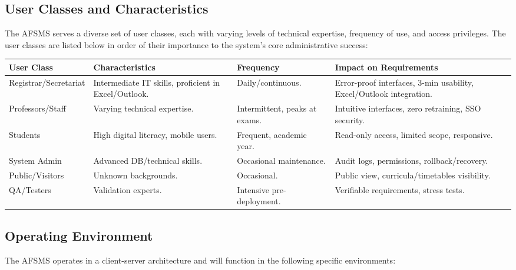 \documentclass[11pt, a4paper]{article}
\renewcommand{\arraystretch}{1.3} %
\begin{document}
\subsection{User Classes and Characteristics}
The AFSMS serves a diverse set of user classes, each with varying levels of technical expertise, frequency of use, and access privileges. The user classes are listed below in order of their importance to the system's core administrative success:

\begin{table}[H]
\centering
\small
\setlength{\arraystretch}{0.85}
\begin{tabularx}{\textwidth}{>{\raggedright\arraybackslash}p{2.2cm} >{\raggedright\arraybackslash}X >{\raggedright\arraybackslash}X >{\raggedright\arraybackslash}X}
\toprule
\textbf{User Class} & \textbf{Characteristics} & \textbf{Frequency} & \textbf{Impact on Requirements} \\
\midrule
Registrar/Secretariat & Intermediate IT skills, proficient in Excel/Outlook. & Daily/continuous. & Error-proof interfaces, 3-min usability, Excel/Outlook integration. \\
\midrule
Professors/Staff & Varying technical expertise. & Intermittent, peaks at exams. & Intuitive interfaces, zero retraining, SSO security. \\
\midrule
Students & High digital literacy, mobile users. & Frequent, academic year. & Read-only access, limited scope, responsive. \\
\midrule
System Admin & Advanced DB/technical skills. & Occasional maintenance. & Audit logs, permissions, rollback/recovery. \\
\midrule
Public/Visitors & Unknown backgrounds. & Occasional. & Public view, curricula/timetables visibility. \\
\midrule
QA/Testers & Validation experts. & Intensive pre-deployment. & Verifiable requirements, stress tests. \\
\bottomrule
\end{tabularx}
\normalsize
\setlength{\arraystretch}{1.3}
\end{table}

\subsection{Operating Environment}
The AFSMS operates in a client-server architecture and will function in the following specific environments:
\end{document}
